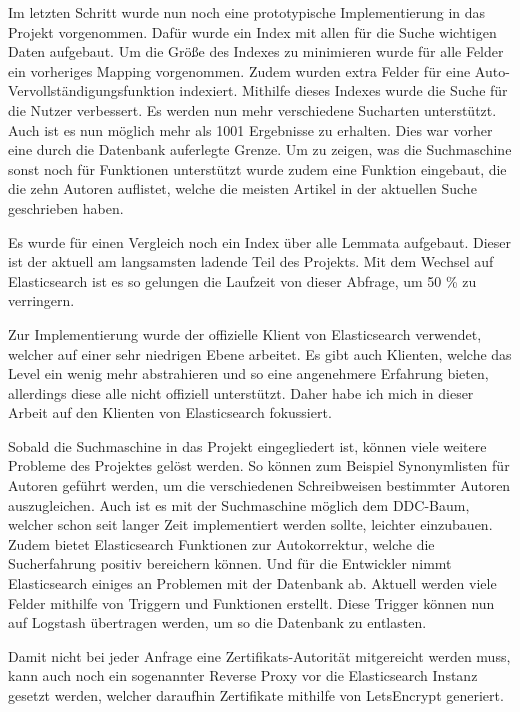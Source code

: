 Im letzten Schritt wurde nun noch eine prototypische Implementierung in das Projekt vorgenommen. Dafür wurde ein Index mit allen für die Suche wichtigen Daten aufgebaut. Um die Größe des Indexes zu minimieren wurde für alle Felder ein vorheriges Mapping vorgenommen. Zudem wurden extra Felder für eine Auto-Vervollständigungsfunktion indexiert. Mithilfe dieses Indexes wurde die Suche für die Nutzer verbessert. Es werden nun mehr verschiedene Sucharten unterstützt. Auch ist es nun möglich mehr als 1001 Ergebnisse zu erhalten. Dies war vorher eine durch die Datenbank auferlegte Grenze. Um zu zeigen, was die Suchmaschine sonst noch für Funktionen unterstützt wurde zudem eine Funktion eingebaut, die die zehn Autoren auflistet, welche die meisten Artikel in der aktuellen Suche geschrieben haben. 

Es wurde für einen Vergleich noch ein Index über alle Lemmata aufgebaut. Dieser ist der aktuell am langsamsten ladende Teil des Projekts. Mit dem Wechsel auf Elasticsearch ist es so gelungen die Laufzeit von dieser Abfrage, um 50 \% zu verringern. 

Zur Implementierung wurde der offizielle Klient von Elasticsearch verwendet, welcher auf einer sehr niedrigen Ebene arbeitet. Es gibt auch Klienten, welche das Level ein wenig mehr abstrahieren und so eine angenehmere Erfahrung bieten, allerdings diese alle nicht offiziell unterstützt. Daher habe ich mich in dieser Arbeit auf den Klienten von Elasticsearch fokussiert. 

Sobald die Suchmaschine in das Projekt eingegliedert ist, können viele weitere Probleme des Projektes gelöst werden. So können zum Beispiel Synonymlisten für Autoren geführt werden, um die verschiedenen Schreibweisen bestimmter Autoren auszugleichen. Auch ist es mit der Suchmaschine möglich dem DDC-Baum, welcher schon seit langer Zeit implementiert werden sollte, leichter einzubauen. Zudem bietet Elasticsearch Funktionen zur Autokorrektur, welche die Sucherfahrung positiv bereichern können. Und für die Entwickler nimmt Elasticsearch einiges an Problemen mit der Datenbank ab. Aktuell werden viele Felder mithilfe von Triggern und Funktionen erstellt. Diese Trigger können nun auf Logstash übertragen werden, um so die Datenbank zu entlasten.

Damit nicht bei jeder Anfrage eine Zertifikats-Autorität mitgereicht werden muss, kann auch noch ein sogenannter Reverse Proxy vor die Elasticsearch Instanz gesetzt werden, welcher daraufhin Zertifikate mithilfe von LetsEncrypt generiert.